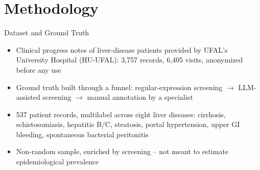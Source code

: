\documentclass[9pt]{beamer}
\begin{document}
    \section{Methodology}


    \begin{frame}{Dataset and Ground Truth}
        \begin{itemize}
            \item Clinical progress notes of liver-disease patients provided by UFAL's University Hospital (HU-UFAL): 3,757 records, 6,405 visits, anonymized before any use
            \item Ground truth built through a funnel: regular-expression screening $\to$ LLM-assisted screening $\to$ manual annotation by a specialist
            \item 537 patient records, multilabel across eight liver diseases: cirrhosis, schistosomiasis, hepatitis B/C, steatosis, portal hypertension, upper GI bleeding, spontaneous bacterial peritonitis
            \item Non-random sample, enriched by screening -- not meant to estimate epidemiological prevalence
        \end{itemize}
    \end{frame}
\end{document}
